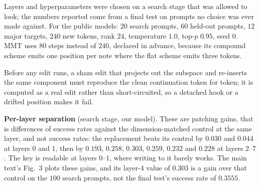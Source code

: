 \documentclass{article}
\begin{document}
%
Layers and hyperparameters were chosen on a search stage that was allowed to look; the
numbers reported come from a final test on prompts no choice was ever made against.
For the public models: $20$ search prompts, $60$ held-out prompts, $12$ major targets,
$240$ new tokens, rank $24$, temperature $1.0$, top-$p$ $0.95$, seed $0$. MMT uses
$80$ steps instead of $240$, declared in advance, because its compound scheme emits one
position per note where the flat scheme emits three tokens.

Before any edit runs, a sham edit that projects out the subspace and re-inserts the
same component must reproduce the clean continuation token for token; it is computed
as a real edit rather than short-circuited, so a detached hook or a drifted position
makes it fail.

\textbf{Per-layer separation} (search stage, our model). These are patching gains, that is
differences of success rates against the dimension-matched control at the same layer,
and not success rates: the replacement beats its control by $0.030$ and $0.044$ at
layers $0$ and $1$, then by $0.193$, $0.258$, $0.303$, $0.259$, $0.232$ and $0.228$ at
layers $2$--$7$. The key is readable at layers $0$--$1$, where writing to it barely
works. The main text's Fig.~3 plots these gains, and its layer-$4$ value of $0.303$ is a
gain over that control on the $100$ search prompts, not the final test's success rate of
$0.3555$.
\end{document}
